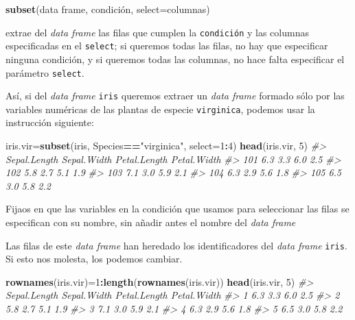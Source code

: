 \documentclass[
]{book}
\newenvironment{Shaded}{\begin{snugshade}}{\end{snugshade}}
\newcommand{\CommentTok}[1]{\textcolor[rgb]{0.56,0.35,0.01}{\textit{#1}}}
\newcommand{\DataTypeTok}[1]{\textcolor[rgb]{0.13,0.29,0.53}{#1}}
\newcommand{\DecValTok}[1]{\textcolor[rgb]{0.00,0.00,0.81}{#1}}
\newcommand{\KeywordTok}[1]{\textcolor[rgb]{0.13,0.29,0.53}{\textbf{#1}}}
\newcommand{\NormalTok}[1]{#1}
\newcommand{\OperatorTok}[1]{\textcolor[rgb]{0.81,0.36,0.00}{\textbf{#1}}}
\newcommand{\StringTok}[1]{\textcolor[rgb]{0.31,0.60,0.02}{#1}}
\theoremstyle{definition}
\theoremstyle{definition}
\theoremstyle{definition}
\theoremstyle{remark}
\begin{document}
\begin{Shaded}
\begin{Highlighting}[]
\KeywordTok{subset}\NormalTok{(data frame, condición, }\DataTypeTok{select=}\NormalTok{columnas)}
\end{Highlighting}
\end{Shaded}

extrae del \emph{data frame} las filas que cumplen la \texttt{condición} y las columnas especificadas en el \texttt{select}; si queremos todas las filas, no hay que especificar ninguna condición, y si queremos todas las columnas, no hace falta especificar el parámetro \texttt{select}.

Así, si del \emph{data frame} \texttt{iris} queremos extraer un \emph{data frame} formado sólo por las variables numéricas de las plantas de especie \texttt{virginica}, podemos usar la instrucción siguiente:

\begin{Shaded}
\begin{Highlighting}[]
\NormalTok{iris.vir=}\KeywordTok{subset}\NormalTok{(iris, Species}\OperatorTok{==}\StringTok{"virginica"}\NormalTok{, }\DataTypeTok{select=}\DecValTok{1}\OperatorTok{:}\DecValTok{4}\NormalTok{)}
\KeywordTok{head}\NormalTok{(iris.vir, }\DecValTok{5}\NormalTok{)}
\CommentTok{\#\textgreater{}     Sepal.Length Sepal.Width Petal.Length Petal.Width}
\CommentTok{\#\textgreater{} 101          6.3         3.3          6.0         2.5}
\CommentTok{\#\textgreater{} 102          5.8         2.7          5.1         1.9}
\CommentTok{\#\textgreater{} 103          7.1         3.0          5.9         2.1}
\CommentTok{\#\textgreater{} 104          6.3         2.9          5.6         1.8}
\CommentTok{\#\textgreater{} 105          6.5         3.0          5.8         2.2}
\end{Highlighting}
\end{Shaded}

Fijaos en que las variables en la condición que usamos para seleccionar las filas se especifican con su nombre, sin añadir antes el nombre del \emph{data frame}

Las filas de este \emph{data frame} han heredado los identificadores del \emph{data frame} \texttt{iris}. Si esto nos molesta, los podemos cambiar.

\begin{Shaded}
\begin{Highlighting}[]
\KeywordTok{rownames}\NormalTok{(iris.vir)=}\DecValTok{1}\OperatorTok{:}\KeywordTok{length}\NormalTok{(}\KeywordTok{rownames}\NormalTok{(iris.vir))}
\KeywordTok{head}\NormalTok{(iris.vir, }\DecValTok{5}\NormalTok{)}
\CommentTok{\#\textgreater{}   Sepal.Length Sepal.Width Petal.Length Petal.Width}
\CommentTok{\#\textgreater{} 1          6.3         3.3          6.0         2.5}
\CommentTok{\#\textgreater{} 2          5.8         2.7          5.1         1.9}
\CommentTok{\#\textgreater{} 3          7.1         3.0          5.9         2.1}
\CommentTok{\#\textgreater{} 4          6.3         2.9          5.6         1.8}
\CommentTok{\#\textgreater{} 5          6.5         3.0          5.8         2.2}
\end{Highlighting}
\end{Shaded}
\end{document}
